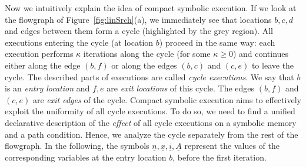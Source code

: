 \documentclass{sig-alternate}%
\newcommand{\sym}[1]{\ensuremath{\underline{#1}}}
\begin{document}
\smallskip Now we intuitively explain the idea of compact symbolic
execution. If we look at the flowgraph of Figure~\ref{fig:linSrch}(a), we
immediately see that locations $b,c,d$ and edges between them form a cycle
(highlighted by the grey region). All executions entering the cycle (at
location $b$) proceed in the same way: each execution performs $\kappa$
iterations along the cycle (for some $\kappa\ge0$) and continues either
along the edge $(b,f)$ or along the edges $(b,c)$ and $(c,e)$ to leave the
cycle. The described parts of executions are called \emph{cycle executions}.
We say that $b$ is an \emph{entry location} and $f,e$ are \emph{exit
  locations} of this cycle. The edges $(b,f)$ and $(c,e)$ are \emph{exit
  edges} of the cycle.
%
%
Compact symbolic execution aims to effectively exploit the uniformity of all
cycle executions. To do so, we need to find a unified declarative
description of the \emph{effect} of all cycle executions on a symbolic
memory and a path condition. Hence, we analyze the cycle separately from the
rest of the flowgraph. In the following, the symbols
$\sym{n},\sym{x},\sym{i},\sym{A}$ represent the values of the corresponding
variables at the entry location $b$, before the first iteration.
\end{document}
